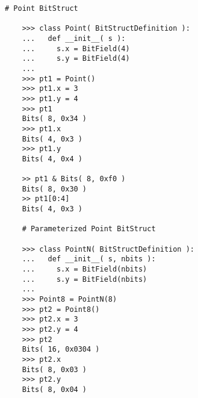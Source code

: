 

  \begin{lstlisting}[gobble=4]
    # Point BitStruct

    >>> class Point( BitStructDefinition ):
    ...   def __init__( s ):
    ...     s.x = BitField(4)
    ...     s.y = BitField(4)
    ...
    >>> pt1 = Point()
    >>> pt1.x = 3
    >>> pt1.y = 4
    >>> pt1
    Bits( 8, 0x34 )
    >>> pt1.x
    Bits( 4, 0x3 )
    >>> pt1.y
    Bits( 4, 0x4 )

    >> pt1 & Bits( 8, 0xf0 )
    Bits( 8, 0x30 )
    >> pt1[0:4]
    Bits( 4, 0x3 )

    # Parameterized Point BitStruct

    >>> class PointN( BitStructDefinition ):
    ...   def __init__( s, nbits ):
    ...     s.x = BitField(nbits)
    ...     s.y = BitField(nbits)
    ...
    >>> Point8 = PointN(8)
    >>> pt2 = Point8()
    >>> pt2.x = 3
    >>> pt2.y = 4
    >>> pt2
    Bits( 16, 0x0304 )
    >>> pt2.x
    Bits( 8, 0x03 )
    >>> pt2.y
    Bits( 8, 0x04 )
  \end{lstlisting}

  \captionsetup{justification=centering}
  \label{code-tut3-basics-bitstruct}

